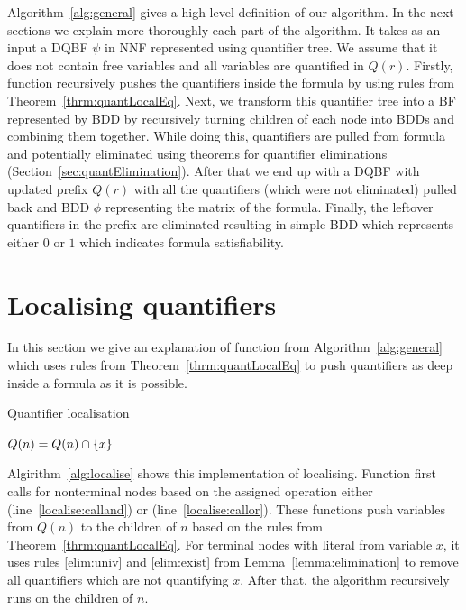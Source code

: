 \documentclass[
  digital, %
  color,
  twoside, %
  table,   %
  nolof,     %
  nolot,     %
]{fithesis3}
\let\setbuilder\set
\newcommand{\simpleset}[1]{\{{#1}\}}
\renewcommand{\set}[1]{\normalexpandarg\IfSubStr{#1}{|}{\setbuilder{#1}}{\simpleset{#1}}}
\theoremstyle{definition}
\theoremstyle{remark}
\newcommand{\qtlabel}[1]{l({#1})}
\newcommand{\prefix}[1]{Q({#1})}
\newcommand{\children}[1]{children({#1})}
\begin{document}
Algorithm~\ref{alg:general} gives a high level definition of our algorithm. In the next sections we explain more thoroughly each part of the algorithm. It takes as an input a DQBF $\psi$ in NNF represented using quantifier tree. We assume that it does not contain free variables and all variables are quantified in $\prefix{r}$. Firstly, function  recursively pushes the quantifiers inside the formula by using rules from Theorem~\ref{thrm:quantLocalEq}. Next, we transform this quantifier tree into a BF represented by BDD by recursively turning children of each node into BDDs and combining them together. While doing this, quantifiers are pulled from formula and potentially eliminated using theorems for quantifier eliminations (Section~\ref{sec:quantElimination}). After that we end up with a DQBF with updated prefix $\prefix{r}$ with all the quantifiers (which were not eliminated) pulled back and BDD $\phi$ representing the matrix of the formula. Finally, the leftover quantifiers in the prefix are eliminated resulting in simple BDD which represents either $0$ or $1$ which indicates formula satisfiability.

\section{Localising quantifiers}
\label{sec:alglocalise}
In this section we give an explanation of function  from Algorithm~\ref{alg:general} which uses rules from Theorem~\ref{thrm:quantLocalEq} to push quantifiers as deep inside a formula as it is possible.

\begin{algorithm}
  \caption{Quantifier localisation}
  \label{alg:localise}
  \begin{algorithmic}[1]
      \If{$\qtlabel{n} = {\land}$}
        \State {}\label{localise:calland}
      \ElsIf{$\qtlabel{n} = {\lor}$}
        \State {}\label{localise:callor}
      \ElsIf{$\qtlabel{n} = x$ or $\qtlabel{n} = \neg x$}
        \State $\prefix{n} = \prefix{n} \cap \set{x}$\label{localise:eliminate}
      \EndIf
      \ForAll{$n' \in \children{n}$}
        \State {}\label{localise:callchildren}
      \EndFor
    \EndFunction
  \end{algorithmic}
\end{algorithm}

Algirithm~\ref{alg:localise} shows this implementation of localising. Function  first calls for nonterminal nodes based on the assigned operation either  (line~\ref{localise:calland}) or  (line~\ref{localise:callor}). These functions push variables from $\prefix{n}$ to the children of $n$ based on the rules from Theorem~\ref{thrm:quantLocalEq}. For terminal nodes with literal from variable $x$, it uses rules \eqref{elim:univ} and \eqref{elim:exist} from Lemma~\ref{lemma:elimination} to remove all quantifiers which are not quantifying $x$. After that, the algorithm recursively runs  on the children of $n$.
\end{document}
